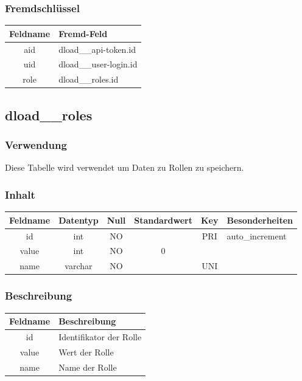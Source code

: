 \subsubsection{Fremdschlüssel}
\begin{table}[H]
	\begin{tabular}{|c|p{12.5cm}|}
		\hline
		\textbf{Feldname} & \textbf{Fremd-Feld} \\ \hline
		aid & dload\_\_api-token.id \\ \hline
		uid & dload\_\_user-login.id \\ \hline
		role & dload\_\_roles.id \\ \hline
	\end{tabular}
\end{table}
\subsection{dload\_\_roles}
\subsubsection{Verwendung} Diese Tabelle wird verwendet um Daten zu Rollen zu speichern.
\subsubsection{Inhalt}
\begin{table}[H]
	\begin{tabular}{|c|c|c|c|c|p{3.5cm}|}
		\hline
		\textbf{Feldname} & \textbf{Datentyp} & \textbf{Null} & \textbf{Standardwert} & \textbf{Key}   & \textbf{Besonderheiten} \\ \hline
		id & int & NO &  & PRI & auto\_increment \\ \hline
		value & int & NO & 0 &  & \\ \hline
		name & varchar & NO &  & UNI & \\ \hline
	\end{tabular}
\end{table}
\subsubsection{Beschreibung}
\begin{table}[H]
	\begin{tabular}{|c|p{12cm}|}
		\hline
		\textbf{Feldname} & \textbf{Beschreibung} \\ \hline
		id & Identifikator der Rolle \\ \hline
		value & Wert der Rolle \\ \hline
		name & Name der Rolle \\ \hline
	\end{tabular}
\end{table}
